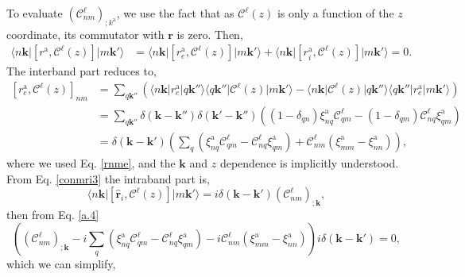 To evaluate $(\mathcal{C}^{\ell}_{nm})_{;k^\mathrm{a}}$, we use the fact that as
$\mathcal{C}^{\ell}(z)$ is only a function of the $z$ coordinate, its commutator
with $\mathbf{r}$ is zero. Then,
\begin{align}\label{a.4}
\langle n\mathbf{k}\vert
\left[r^\mathrm{a},\mathcal{C}^{\ell}(z)\right]
\vert m\mathbf{k}'\rangle
&= \langle n\mathbf{k}\vert
\left[r_{e}^\mathrm{a},\mathcal{C}^{\ell}(z)\right]
\vert m\mathbf{k}'\rangle
+ \langle n\mathbf{k}\vert
\left[r_{i}^\mathrm{a},\mathcal{C}^{\ell}(z)\right]
\vert m\mathbf{k}'\rangle = 0.
\end{align} 
The interband part reduces to,
\begin{align}\label{a.5}
\left[r_{e}^\mathrm{a},\mathcal{C}^{\ell}(z)\right]_{nm}
&= \sum_{q\mathbf{k}''}
\left(
  \langle n\mathbf{k}\vert r_{e}^\mathrm{a}\vert q\mathbf{k}''\rangle
  \langle q\mathbf{k}''\vert\mathcal{C}^{\ell}(z)\vert m\mathbf{k}'\rangle
- \langle n\mathbf{k}\vert\mathcal{C}^{\ell}(z)\vert q\mathbf{k}''\rangle
  \langle q\mathbf{k}''\vert r_{e}^\mathrm{a}\vert m\mathbf{k}'\rangle
\right)\nonumber\\
&= \sum_{q\mathbf{k}''}
\delta(\mathbf{k}-\mathbf{k}'')
\delta(\mathbf{k}'-\mathbf{k}'')
\left(
  (1-\delta_{qn})\xi_{nq}^\mathrm{a}\mathcal{C}^{\ell}_{qm}
- (1-\delta_{qm})\mathcal{C}^{\ell}_{nq}\xi_{qm}^\mathrm{a}
\right)\nonumber\\
&= \delta(\mathbf{k}-\mathbf{k}')
\left(
\sum_{q}
\left(
  \xi_{nq}^\mathrm{a}\mathcal{C}^{\ell}_{qm}
- \mathcal{C}^{\ell}_{nq}\xi_{qm}^\mathrm{a}
\right)
+ \mathcal{C}^{\ell}_{nm}(\xi_{mm}^\mathrm{a}-\xi_{nn}^\mathrm{a})
\right),
\end{align}
where we used Eq. \eqref{rnme}, and the $\mathbf{k}$ and $z$ dependence is
implicitly understood. From Eq. \eqref{conmri3} the intraband part is,
\begin{equation}\label{a.6}
\langle n\mathbf{k}\vert
\left[\hat{\mathbf{r}}_{i},\mathcal{C}^{\ell}(z)\right]
\vert m\mathbf{k}'\rangle
= i\delta(\mathbf{k}-\mathbf{k}')(\mathcal{C}^{\ell}_{nm})_{;\mathbf{k}},
\end{equation}
then from Eq. \eqref{a.4}
\begin{equation}
\left(
(\mathcal{C}^{\ell}_{nm})_{;\mathbf{k}} - i\sum_{q}
\left(\xi_{nq}^\mathrm{a}\mathcal{C}^{\ell}_{qm}
     - \mathcal{C}^{\ell}_{nq}\xi_{qm}^\mathrm{a}\right)
- i\mathcal{C}^{\ell}_{nm}(\xi_{mm}^\mathrm{a}-\xi_{nn}^\mathrm{a})
\right)
i\delta(\mathbf{k}-\mathbf{k}')
= 0,
\end{equation}
which we can simplify,
